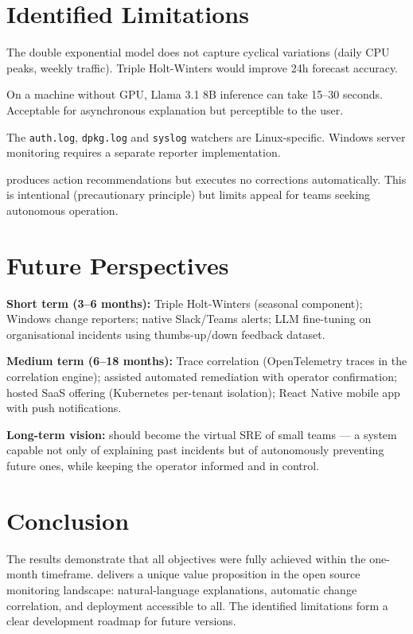 \section{Identified Limitations}

\begin{description}[leftmargin=2cm]
  \item[No seasonal component in Holt-Winters] The double exponential model
    does not capture cyclical variations (daily CPU peaks, weekly traffic).
    Triple Holt-Winters would improve 24h forecast accuracy.
  \item[LLM quality depends on hardware] On a machine without GPU, Llama 3.1 8B
    inference can take 15--30 seconds. Acceptable for asynchronous explanation
    but perceptible to the user.
  \item[Linux-only agent change reporters] The \texttt{auth.log}, \texttt{dpkg.log}
    and \texttt{syslog} watchers are Linux-specific. Windows server monitoring
    requires a separate reporter implementation.
  \item[No automated remediation] \caimp{} produces action recommendations but
    executes no corrections automatically. This is intentional (precautionary
    principle) but limits appeal for teams seeking autonomous operation.
\end{description}

\section{Future Perspectives}

\textbf{Short term (3--6 months):}
Triple Holt-Winters (seasonal component); Windows change reporters; native
Slack/Teams alerts; LLM fine-tuning on organisational incidents using
thumbs-up/down feedback dataset.

\textbf{Medium term (6--18 months):}
Trace correlation (OpenTelemetry traces in the correlation engine); assisted
automated remediation with operator confirmation; hosted SaaS offering
(Kubernetes per-tenant isolation); React Native mobile app with push notifications.

\textbf{Long-term vision:}
\caimp{} should become the virtual SRE of small teams — a system capable not
only of explaining past incidents but of autonomously preventing future ones,
while keeping the operator informed and in control.

\section*{Conclusion}

The results demonstrate that all objectives were fully achieved within the
one-month timeframe. \caimp{} delivers a unique value proposition in the open
source monitoring landscape: natural-language explanations, automatic change
correlation, and deployment accessible to all. The identified limitations form
a clear development roadmap for future versions.

